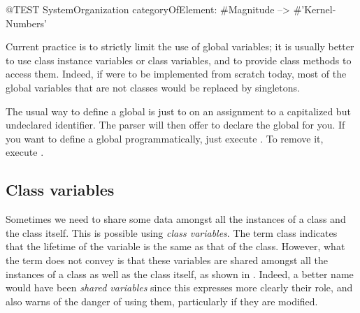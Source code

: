 \documentclass[a4paper,10pt,twoside]{book}
\begin{document}
\begin{code}{@TEST}
SystemOrganization categoryOfElement: #Magnitude --> #'Kernel-Numbers'
\end{code}

Current practice is to strictly limit the use of global variables; it is usually better to use class instance variables or class variables, and to provide class methods to access them.  Indeed, if \pharo were to be implemented from scratch today, most of the global variables that are not classes would be replaced by singletons.

The usual way to define a global is just to  on an assignment to a capitalized but undeclared identifier.  The parser will then offer to declare the global for you.  If you want to define a global programmatically, just execute .  To remove it, execute .

\subsection{Class variables}

Sometimes we need to share some data amongst all the instances of a 
class and the class itself.
This is possible using \emph{class variables}. 
The term class  indicates that the lifetime of the variable is the same as that of the class. However, what the
term does not convey is that these variables are shared amongst all the instances of a class as well as the class itself,
as shown in .
Indeed, a better name would have been \emph{shared variables} since this expresses more clearly their role, and also warns of the danger of using them, particularly if they are modified.
\end{document}
